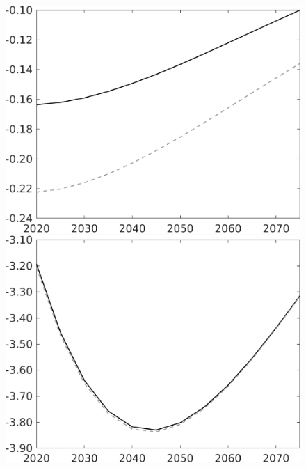 \documentclass[12pt]{article}
\begin{document}
\begin{figure}[h!!]
\begin{minipage}[]{0.32\textwidth}
	\end{minipage}	
\begin{minipage}[]{0.32\textwidth}
\includegraphics[width=1\textwidth]{../../codding_model/own_basedOnFried/optimalPol_010922_revision/figures/all_13Sept22/PerdifNoTauf_Equlab_regime0_CompTaul_hl_spillover0_nsk0_xgr0_knspil1_sep1_LFlimit0_emsbase0_countec0_GovRev0_etaa0.79_lgd0.png}
\end{minipage}	
	\begin{minipage}[]{0.32\textwidth}
		\includegraphics[width=1\textwidth]{../../codding_model/own_basedOnFried/optimalPol_010922_revision/figures/all_13Sept22/PerdifNoTauf_Equlab_regime0_CompTaul_C_spillover0_nsk0_xgr0_knspil1_sep1_LFlimit0_emsbase0_countec0_GovRev0_etaa0.79_lgd0.png}

\end{minipage}
\end{figure}
\end{document}

